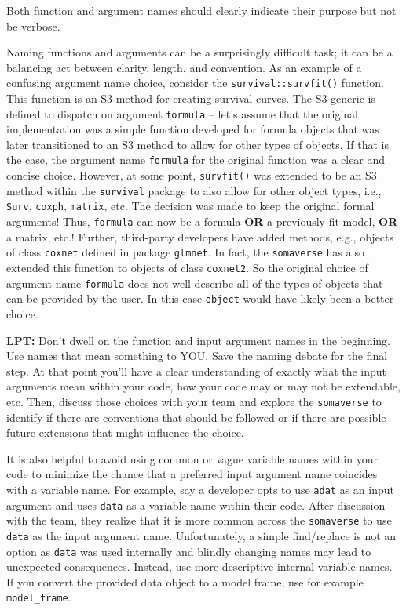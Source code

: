 \documentclass[
]{book}
\begin{document}
Both function and argument names should clearly indicate their purpose but not be verbose.

Naming functions and arguments can be a surprisingly difficult task; it can be a balancing act between clarity, length, and convention. As an example of a confusing argument name choice, consider the \texttt{survival::survfit()} function. This function is an S3 method for creating survival curves. The S3 generic is defined to dispatch on argument \texttt{formula} -- let's assume that the original implementation was a simple function developed for formula objects that was later transitioned to an S3 method to allow for other types of objects. If that is the case, the argument name \texttt{formula} for the original function was a clear and concise choice. However, at some point, \texttt{survfit()} was extended to be an S3 method within the \texttt{survival} package to also allow for other object types, i.e., \texttt{Surv}, \texttt{coxph}, \texttt{matrix}, etc. The decision was made to keep the original formal arguments! Thus, \texttt{formula} can now be a formula \textbf{OR} a previously fit model, \textbf{OR} a matrix, etc.! Further, third-party developers have added methods, e.g., objects of class \texttt{coxnet} defined in package \texttt{glmnet}. In fact, the \texttt{somaverse} has also extended this function to objects of class \texttt{coxnet2}. So the original choice of argument name \texttt{formula} does not well describe all of the types of objects that can be provided by the user. In this case \texttt{object} would have likely been a better choice.

\textbf{LPT:} Don't dwell on the function and input argument names in the beginning. Use names that mean something to YOU. Save the naming debate for the final step. At that point you'll have a clear understanding of exactly what the input arguments mean within your code, how your code may or may not be extendable, etc. Then, discuss those choices with your team and explore the \texttt{somaverse} to identify if there are conventions that should be followed or if there are possible future extensions that might influence the choice.

It is also helpful to avoid using common or vague variable names within your code to minimize the chance that a preferred input argument name coincides with a variable name. For example, say a developer opts to use \texttt{adat} as an input argument and uses \texttt{data} as a variable name within their code. After discussion with the team, they realize that it is more common across the \texttt{somaverse} to use \texttt{data} as the input argument name. Unfortunately, a simple find/replace is not an option as \texttt{data} was used internally and blindly changing names may lead to unexpected consequences. Instead, use more descriptive internal variable names. If you convert the provided data object to a model frame, use for example \texttt{model\_frame}.
\end{document}
